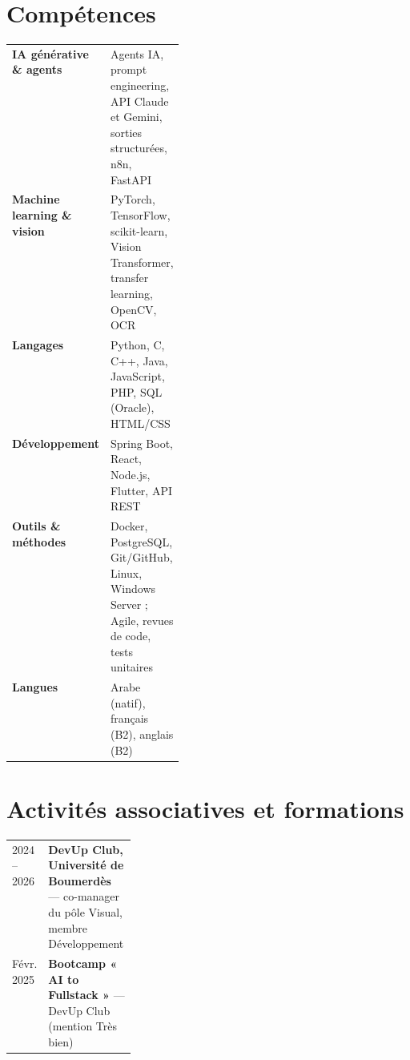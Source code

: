 \documentclass[a4paper,10pt]{article}
\begin{document}
\section{Compétences}
\begin{tabularx}{\linewidth}{@{}>{\bfseries}p{0.25\linewidth} X@{}}
IA générative \& agents & Agents IA, prompt engineering, API Claude et Gemini, sorties structurées, n8n, FastAPI \\
Machine learning \& vision & PyTorch, TensorFlow, scikit-learn, Vision Transformer, transfer learning, OpenCV, OCR \\
Langages & Python, C, C++, Java, JavaScript, PHP, SQL (Oracle), HTML/CSS \\
Développement & Spring Boot, React, Node.js, Flutter, API REST \\
Outils \& méthodes & Docker, PostgreSQL, Git/GitHub, Linux, Windows Server ; Agile, revues de code, tests unitaires \\
Langues & Arabe (natif), français (B2), anglais (B2) \\
\end{tabularx}

\section{Activités associatives et formations}
\begin{tabularx}{\linewidth}{@{}p{0.18\linewidth} X@{}}
2024 -- 2026 & \textbf{DevUp Club, Université de Boumerdès} — co-manager du pôle Visual, membre Développement \\
Févr. 2025 & \textbf{Bootcamp « AI to Fullstack »} — DevUp Club (mention Très bien) \\
\end{tabularx}
\end{document}
